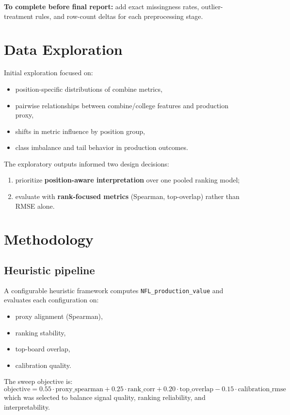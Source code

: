 \documentclass[10pt]{article}
\begin{document}
\textbf{To complete before final report:} add exact missingness rates, outlier-treatment rules, and row-count deltas for each preprocessing stage.

\section{Data Exploration}
Initial exploration focused on:
\begin{itemize}
  \item position-specific distributions of combine metrics,
  \item pairwise relationships between combine/college features and production proxy,
  \item shifts in metric influence by position group,
  \item class imbalance and tail behavior in production outcomes.
\end{itemize}

The exploratory outputs informed two design decisions:
\begin{enumerate}
  \item prioritize \textbf{position-aware interpretation} over one pooled ranking model;
  \item evaluate with \textbf{rank-focused metrics} (Spearman, top-overlap) rather than RMSE alone.
\end{enumerate}

\section{Methodology}
\subsection{Heuristic pipeline}
A configurable heuristic framework computes \texttt{NFL\_production\_value} and evaluates each configuration on:
\begin{itemize}
  \item proxy alignment (Spearman),
  \item ranking stability,
  \item top-board overlap,
  \item calibration quality.
\end{itemize}

The sweep objective is:
\[
\text{objective} = 0.55\cdot\text{proxy\_spearman} + 0.25\cdot\text{rank\_corr} + 0.20\cdot\text{top\_overlap} - 0.15\cdot\text{calibration\_rmse}
\]
which was selected to balance signal quality, ranking reliability, and interpretability.
\end{document}

